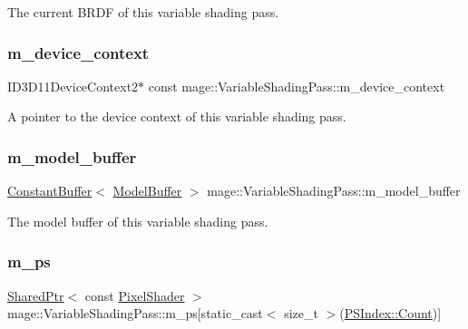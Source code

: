 The current B\+R\+DF of this variable shading pass. \hypertarget{classmage_1_1_variable_shading_pass_afff786ea38b64ba069866fdd6b525ba7}{}\label{classmage_1_1_variable_shading_pass_afff786ea38b64ba069866fdd6b525ba7} 
\subsubsection{\texorpdfstring{m\+\_\+device\+\_\+context}{m\_device\_context}}
{\footnotesize\ttfamily I\+D3\+D11\+Device\+Context2$\ast$ const mage\+::\+Variable\+Shading\+Pass\+::m\+\_\+device\+\_\+context\hspace{0.3cm}{\ttfamily [private]}}

A pointer to the device context of this variable shading pass. \hypertarget{classmage_1_1_variable_shading_pass_ab83602f0ffa6c0a3519ffaa467ae113a}{}\label{classmage_1_1_variable_shading_pass_ab83602f0ffa6c0a3519ffaa467ae113a} 
\subsubsection{\texorpdfstring{m\+\_\+model\+\_\+buffer}{m\_model\_buffer}}
{\footnotesize\ttfamily \hyperlink{structmage_1_1_constant_buffer}{Constant\+Buffer}$<$ \hyperlink{structmage_1_1_model_buffer}{Model\+Buffer} $>$ mage\+::\+Variable\+Shading\+Pass\+::m\+\_\+model\+\_\+buffer\hspace{0.3cm}{\ttfamily [private]}}

The model buffer of this variable shading pass. \hypertarget{classmage_1_1_variable_shading_pass_aacd5b6b967a0fcfe7510e289c3d630a0}{}\label{classmage_1_1_variable_shading_pass_aacd5b6b967a0fcfe7510e289c3d630a0} 
\subsubsection{\texorpdfstring{m\+\_\+ps}{m\_ps}}
{\footnotesize\ttfamily \hyperlink{namespacemage_a1e01ae66713838a7a67d30e44c67703e}{Shared\+Ptr}$<$ const \hyperlink{namespacemage_a27ecaf266420ee7a494d64edc0757129}{Pixel\+Shader} $>$ mage\+::\+Variable\+Shading\+Pass\+::m\+\_\+ps\mbox{[}static\+\_\+cast$<$ size\+\_\+t $>$(\hyperlink{classmage_1_1_variable_shading_pass_a49519e421ac5be93136d9efdbf075d4aae93f994f01c537c4e2f7d8528c3eb5e9}{P\+S\+Index\+::\+Count})\mbox{]}\hspace{0.3cm}{\ttfamily [private]}}

